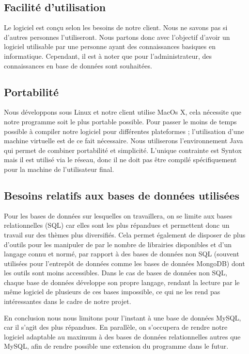 \documentclass[12pt]{report}
\begin{document}
\subsection{Facilité d'utilisation}

Le logiciel est conçu selon les besoins de notre client. Nous ne
savons pas si d'autres personnes l'utiliseront. Nous partons donc avec
l'objectif d'avoir un logiciel utilisable par une personne ayant des
connaissances basiques en informatique. Cependant, il est à noter que
pour l'administrateur, des connaissances en base de données sont
souhaitées.

\subsection{Portabilité}

Nous développons sous Linux et notre client utilise MacOs X, cela
nécessite que notre programme soit le plus portable possible.
Pour passer le moins de temps possible à compiler notre logiciel pour
différentes plateformes ; l'utilisation d'une machine virtuelle est de
ce fait nécessaire.
Nous utiliserons l'environnement Java qui permet de combiner portabilité
et simplicité.
L'unique contrainte est Syntox mais il est utilisé via le réseau, donc
il ne doit pas être compilé spécifiquement pour la machine de
l'utilisateur final.

\subsection{Besoins relatifs aux bases de données utilisées}
  
Pour les bases de données sur lesquelles on travaillera, on se limite
aux bases relationnelles (SQL) car elles sont les plus répandues et
permettent donc un travail sur des thèmes plus diversifiés. Cela
permet également de disposer de plus d'outils pour les manipuler de
par le nombre de librairies disponibles et d'un langage connu et normé,
par rapport à des bases de données non SQL (souvent utilisées pour
l'entrepôt de données comme les bases de données MongoDB) dont les
outils sont moins accessibles. Dans le cas de bases de données non SQL,
chaque base de données développe son propre langage, rendant la lecture
par le même logiciel de plusieurs de ces bases impossible, ce qui ne les
rend pas intéressantes dans le cadre de notre projet.

En conclusion nous nous limitons pour l'instant à une base de données
MySQL, car il s'agit des plus répandues. En parallèle, on s'occupera de
rendre notre logiciel adaptable au maximum à des bases de données
relationnelles autres que MySQL, afin de rendre possible une extension
du programme dans le futur.
\end{document}
